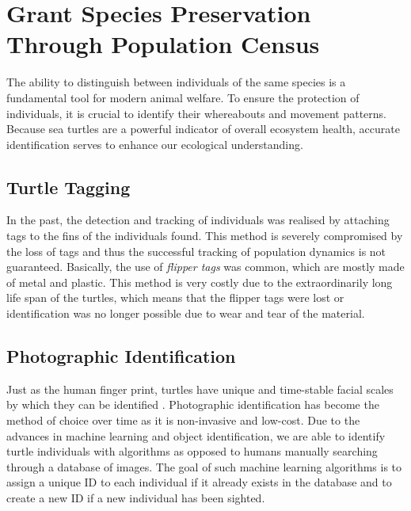 \section{Grant Species Preservation Through Population Census}


The ability to distinguish between individuals of the same species is a fundamental tool for modern animal welfare. To ensure the protection of individuals, it is crucial to identify their whereabouts and movement patterns. Because sea turtles are a powerful indicator of overall ecosystem health, accurate identification serves to enhance our ecological understanding.

\subsection{Turtle Tagging}
In the past, the detection and tracking of individuals was realised by attaching tags to the fins of the individuals found. This method is severely compromised by the loss of tags and thus the successful tracking of population dynamics is not guaranteed. Basically, the use of \emph{flipper tags} was common, which are mostly made of metal and plastic. This method is very costly due to the extraordinarily long life span of the turtles, which means that the flipper tags were lost or identification was no longer possible due to wear and tear of the material.

\subsection{Photographic Identification}
Just as the human finger print, turtles have unique and time-stable facial scales by which they can be identified \citep{Carpentier2016}. Photographic identification has become the method of choice over time as it is non-invasive and low-cost. Due to the advances in machine learning and object identification, we are able to identify turtle individuals with algorithms as opposed to humans manually searching through a database of images. The goal of such machine learning algorithms is to assign a unique ID to each individual if it already exists in the database and to create a new ID if a new individual has been sighted.